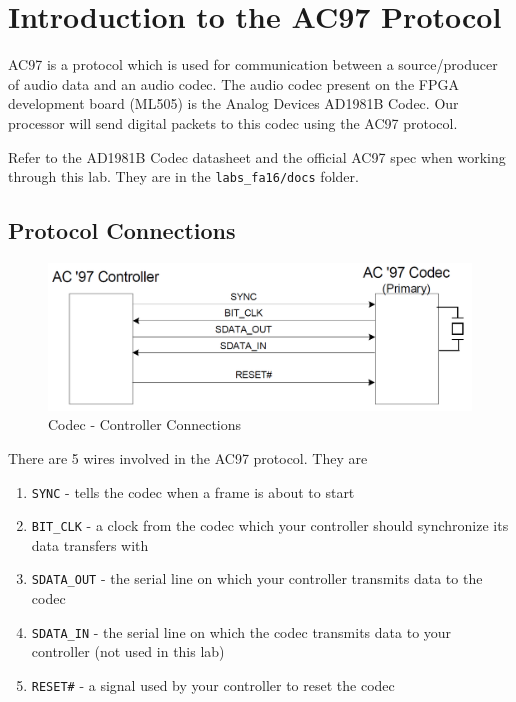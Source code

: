 \documentclass[11pt]{article}
\begin{document}
\section{Introduction to the AC97 Protocol}
AC97 is a protocol which is used for communication between a source/producer of audio data and an audio codec. The audio codec present on the FPGA development board (ML505) is the Analog Devices AD1981B Codec. Our processor will send digital packets to this codec using the AC97 protocol.

Refer to the AD1981B Codec datasheet and the official AC97 spec when working through this lab. They are in the \verb|labs_fa16/docs| folder.

\subsection{Protocol Connections}

\begin{figure}[H]
	\begin{center}
		\includegraphics[width=6in]{ac97_connections}
		\caption{Codec - Controller Connections}
	\end{center}
\end{figure}

There are 5 wires involved in the AC97 protocol. They are

\begin{enumerate}
	\item \verb|SYNC| - tells the codec when a frame is about to start
	\item \verb|BIT_CLK| - a clock from the codec which your controller should synchronize its data transfers with
	\item \verb|SDATA_OUT| - the serial line on which your controller transmits data to the codec
	\item \verb|SDATA_IN| - the serial line on which the codec transmits data to your controller (not used in this lab)
	\item \verb|RESET#| - a signal used by your controller to reset the codec
\end{enumerate}
\end{document}
